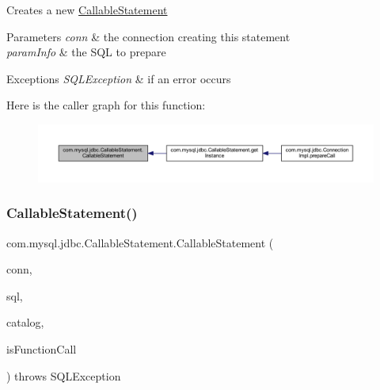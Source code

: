Creates a new \mbox{\hyperlink{classcom_1_1mysql_1_1jdbc_1_1_callable_statement}{Callable\+Statement}}


\begin{DoxyParams}{Parameters}
{\em conn} & the connection creating this statement \\
\hline
{\em param\+Info} & the S\+QL to prepare\\
\hline
\end{DoxyParams}

\begin{DoxyExceptions}{Exceptions}
{\em S\+Q\+L\+Exception} & if an error occurs \\
\hline
\end{DoxyExceptions}
Here is the caller graph for this function\+:\nopagebreak
\begin{figure}[H]
\begin{center}
\leavevmode
\includegraphics[width=350pt]{classcom_1_1mysql_1_1jdbc_1_1_callable_statement_afe23a2502823ac5641c8541a642a5e82_icgraph}
\end{center}
\end{figure}
\mbox{\label{classcom_1_1mysql_1_1jdbc_1_1_callable_statement_add848c7958a17fa7459a677996f3a371}} 
\subsubsection{\texorpdfstring{Callable\+Statement()}{CallableStatement()}\hspace{0.1cm}{\footnotesize\ttfamily [2/2]}}
{\footnotesize\ttfamily com.\+mysql.\+jdbc.\+Callable\+Statement.\+Callable\+Statement (\begin{DoxyParamCaption}\item[{\mbox{\hyperlink{interfacecom_1_1mysql_1_1jdbc_1_1_my_s_q_l_connection}{My\+S\+Q\+L\+Connection}}}]{conn,  }\item[{String}]{sql,  }\item[{String}]{catalog,  }\item[{boolean}]{is\+Function\+Call }\end{DoxyParamCaption}) throws S\+Q\+L\+Exception}

